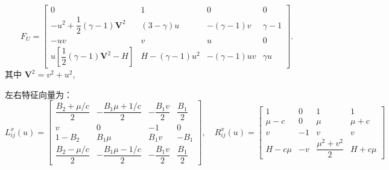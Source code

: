 \documentclass{book}
\begin{document}
\begin{equation}
    F_U=\begin{bmatrix}
        0                                                     & 1                  & 0               & 0        \\
        -u^{2}+\dfrac{1}{2}(\gamma-1) \mathbf{V}^{2}          & (3-\gamma) u       & -(\gamma-1) v   & \gamma-1 \\
        -u v                                                  & v                  & u               & 0        \\
        u\left[\dfrac{1}{2}(\gamma-1) \mathbf{V}^{2}-H\right] & H-(\gamma-1) u^{2} & -(\gamma-1) u v & \gamma u
    \end{bmatrix} .
\end{equation}
其中 $\mathbf{V}^2=v^2+u^2$,

左右特征向量为\cite{RN95}：
\begin{equation}
    L_{i j}^{x}(u)=\begin{bmatrix}
        \dfrac{B_{2}+\mu / c}{2} & -\dfrac{B_{1} \mu+1 / c}{2} & -\dfrac{B_{1} v}{2} & \dfrac{B_{1}}{2} \\
        v                        & 0                           & -1                  & 0                \\
        1-B_{2}                  & B_{1} \mu                   & B_{1} v             & -B_{1}           \\
        \dfrac{B_{2}-\mu / c}{2} & -\dfrac{B_{1} \mu-1 / c}{2} & -\dfrac{B_{1} v}{2} & \dfrac{B_{1}}{2}
    \end{bmatrix},\quad
    R_{i j}^{x}(u)=\begin{bmatrix}
        1       & 0  & 1                        & 1       \\
        \mu-c   & 0  & \mu                      & \mu+c   \\
        v       & -1 & v                        & v       \\
        H-c \mu & -v & \dfrac{\mu^{2}+v^{2}}{2} & H+c \mu
    \end{bmatrix}
\end{equation}
\end{document}
